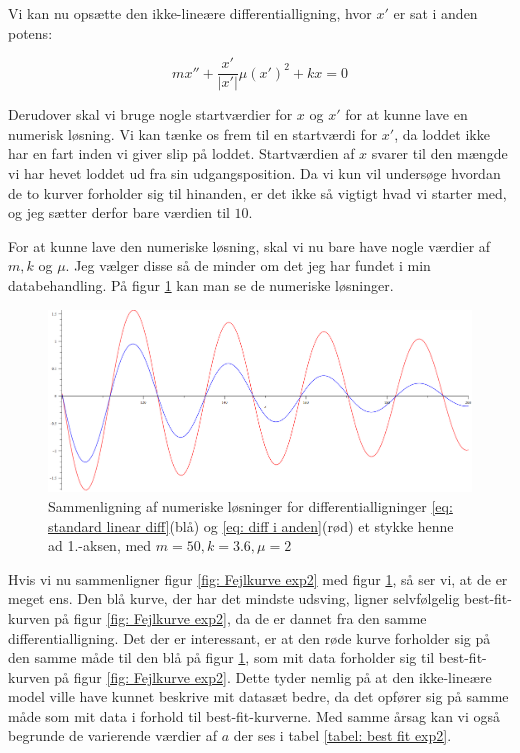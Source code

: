 Vi kan nu opsætte den ikke-lineære differentialligning, hvor $x'$ er sat i anden potens:

\begin{equation}
mx'' + \frac{x'}{|x'|} \mu  (x')^2 + kx = 0
\label{eq: diff i anden}
\end{equation}

Derudover skal vi bruge nogle startværdier for $x$ og $x'$ for at kunne lave en numerisk løsning.
Vi kan tænke os frem til en startværdi for $x'$, da loddet ikke har en fart inden vi giver slip på loddet. 
Startværdien af $x$ svarer til den mængde vi har hevet loddet ud fra sin udgangsposition. 
Da vi kun vil undersøge hvordan de to kurver forholder sig til hinanden, er det ikke så vigtigt hvad vi starter med, og jeg sætter derfor bare værdien til $10$.

For at kunne lave den numeriske løsning, skal vi nu bare have nogle værdier af $m,k$ og $\mu$. 
Jeg vælger disse så de minder om det jeg har fundet i min databehandling. 
På figur \ref{fig: numeriske solutions} kan man se de numeriske løsninger. 

\begin{figure}[h]
\centering
\includegraphics[scale=0.45]{Figurer/diffligninger}
\caption{Sammenligning af numeriske løsninger for differentialligninger \ref{eq: standard linear diff}(blå) og \ref{eq: diff i anden}(rød) et stykke henne ad 1.-aksen, med $m=50,k=3.6,\mu=2$}
\label{fig: numeriske solutions}

\end{figure}

Hvis vi nu sammenligner figur \ref{fig: Fejlkurve exp2} med figur \ref{fig: numeriske solutions}, så ser vi, at de er meget ens. 
Den blå kurve, der har det mindste udsving, ligner selvfølgelig best-fit-kurven på figur \ref{fig: Fejlkurve exp2}, da de er dannet fra den samme differentialligning. 
Det der er interessant, er at den røde kurve forholder sig på den samme måde til den blå på figur \ref{fig: numeriske solutions}, som mit data forholder sig til best-fit-kurven på figur \ref{fig: Fejlkurve exp2}. 
Dette tyder nemlig på at den ikke-lineære model ville have kunnet beskrive mit datasæt bedre, da det opfører sig på samme måde som mit data i forhold til best-fit-kurverne. 
Med samme årsag kan vi også begrunde de varierende værdier af $a$ der ses i tabel \ref{tabel: best fit exp2}.





